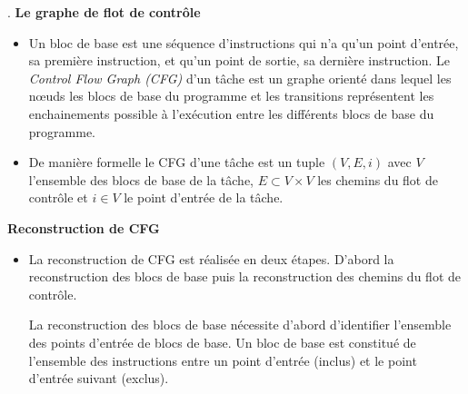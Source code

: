 \documentclass[final]{beamer}
\begin{document}
\begin{frame}
\begin{textblock}{39}
\begin{block}{\thesection. \secname}
        \textbf{Le graphe de flot de contrôle}
        \begin{itemize}
          
          \item[] Un bloc de base est une séquence d’instructions qui n’a qu’un
            point d’entrée, sa première instruction, et qu’un point de sortie,
            sa dernière instruction. Le \textit{Control Flow Graph (CFG)} d'un
            tâche est un graphe orienté dans lequel les n{\oe}uds les blocs de
            base du programme et les transitions représentent les enchainements
            possible à l'exécution entre les différents blocs de base du
            programme.
            \vspace{.5em}

          \item[] De manière formelle le CFG d'une tâche est un tuple $(V,E,i)$
            avec $V$ l'ensemble des blocs de base de la tâche, $E \subset V
            \times V$ les chemins du flot de contrôle et $i \in V$ le point
            d'entrée de la tâche.
        \end{itemize}
        \vspace{1em}

        \textbf{Reconstruction de CFG}
        \begin{itemize}
          \item[] La reconstruction de CFG est réalisée en deux étapes. D'abord
            la reconstruction des blocs de base puis la reconstruction des
            chemins du flot de contrôle.
            \vspace{.5em}

            La reconstruction des blocs de base nécessite d'abord d'identifier
            l'ensemble des points d'entrée de blocs de base. Un bloc de base est
            constitué de l'ensemble des instructions entre un point d’entrée
            (inclus) et le point d’entrée suivant (exclus).
            \vspace{.5em}
            


\end{itemize}
\end{block}
\end{textblock}
\end{frame}
\end{document}
